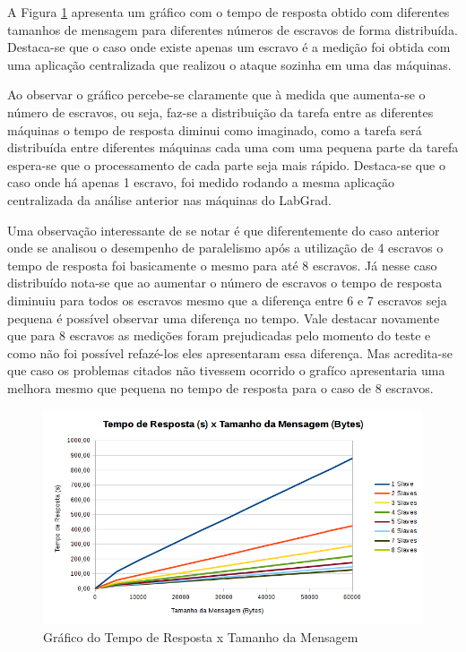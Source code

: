 \documentclass[
	12pt,				%
    oneside,			%
	a4paper,			%
	english,			%
	brazil,				%
	]{abntex2}
\begin{document}
A Figura \ref{fig:dist:tempo_respostaXtamanho_msg} apresenta um gráfico com o tempo de resposta obtido com diferentes tamanhos de mensagem para diferentes números de escravos de forma distribuída. Destaca-se que o caso onde existe apenas um escravo é a medição foi obtida com uma aplicação centralizada que realizou o ataque sozinha em uma das máquinas.

Ao observar o gráfico percebe-se claramente que à medida que aumenta-se o número de escravos, ou seja, faz-se a distribuição da tarefa entre as diferentes máquinas o tempo de resposta diminui como imaginado, como a tarefa será distribuída entre 
diferentes máquinas cada uma com uma pequena parte da tarefa espera-se que o processamento de cada parte seja mais rápido.
Destaca-se que o caso onde há apenas 1 escravo, foi medido rodando a mesma aplicação centralizada da análise anterior nas máquinas do LabGrad.

Uma observação interessante de se notar é que diferentemente do caso anterior onde se analisou o desempenho de paralelismo após a utilização de 4 escravos o tempo de resposta foi basicamente o mesmo para até 8 escravos. Já nesse caso distribuído 
nota-se que ao aumentar o número de escravos o tempo de resposta diminuiu para todos os escravos mesmo que a diferença entre 6 e 7 escravos seja pequena é possível observar uma diferença no tempo. Vale destacar novamente que para 8 escravos as medições foram prejudicadas pelo momento do teste e como não foi possível refazé-los eles apresentaram essa diferença. Mas acredita-se
que caso os problemas citados não tivessem ocorrido o grafíco apresentaria uma melhora mesmo que pequena no tempo de resposta
para o caso de 8 escravos.

\begin{figure}[!htb]
\centering
\includegraphics[scale=0.65]{figuras/temporesposta_distribuido.png}
\caption{Gráfico do Tempo de Resposta x Tamanho da Mensagem}
\label{fig:dist:tempo_respostaXtamanho_msg}
\end{figure}
\end{document}
